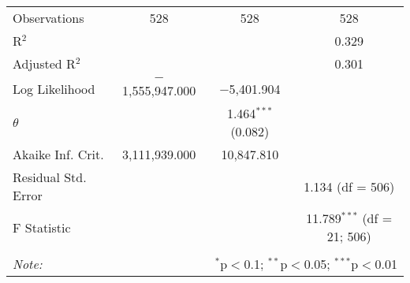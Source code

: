 \begin{table}[!htbp]
\begin{tabular}{@{\extracolsep{5pt}}lccc}
Observations & 528 & 528 & 528 \\ 
R$^{2}$ &  &  & 0.329 \\ 
Adjusted R$^{2}$ &  &  & 0.301 \\ 
Log Likelihood & $-$1,555,947.000 & $-$5,401.904 &  \\ 
$\theta$ &  & 1.464$^{***}$  (0.082) &  \\ 
Akaike Inf. Crit. & 3,111,939.000 & 10,847.810 &  \\ 
Residual Std. Error &  &  & 1.134 (df = 506) \\ 
F Statistic &  &  & 11.789$^{***}$ (df = 21; 506) \\ 
\hline 
\hline \\[-1.8ex] 
\textit{Note:}  & \multicolumn{3}{r}{$^{*}$p$<$0.1; $^{**}$p$<$0.05; $^{***}$p$<$0.01} \\ 
\end{tabular} 
\end{table} 

